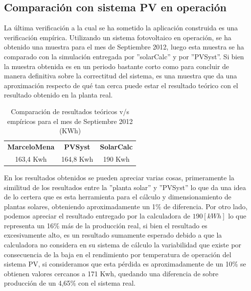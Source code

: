 \newpage
\subsection{Comparación con sistema PV en operación}
La última verificación a la cual se ha sometido la aplicación construida es una verificación empírica. Utilizando un sistema fotovoltaico en operación, se ha obtenido una muestra para el mes de Septiembre 2012, luego esta muestra se ha comparado con la simulación entregada por ''solarCalc'' y por ''PVSyst''. Si bien la muestra obtenida es en un periodo bastante corto como para concluir de manera definitiva sobre la correctitud del sistema, es una muestra que da una aproximación respecto de qué tan cerca puede estar el resultado teórico con el resultado obtenido en la planta real.\\
\begin{table}[h!]
\caption{Comparación de resultados teóricos v/s empíricos para el mes de Septiembre 2012 (KWh)}
\centering
\begin{tabular}{|c|c|c|}
        \hline
        \textbf{MarceloMena}&\textbf{PVSyst}&\textbf{SolarCalc}\\
        163,4 Kwh&    164,8 Kwh&   190 Kwh\\
        \hline
\end{tabular}
\end{table}

En los resultados obtenidos se pueden apreciar varias cosas, primeramente la similitud de los resultados entre la ''planta solar'' y ''PVSyst'' lo que da una idea de lo certera que es esta herramienta para el cálculo y dimensionamiento de plantas solares, obteniendo aproximadamente un 1\% de diferencia. Por otro lado, podemos apreciar el resultado entregado por la calculadora de $190 [kWh]$ lo que representa un 16\% más de la producción real, si bien el resultado es excesivamente alto, es un resultado sumamente esperado debido a que la calculadora no considera en su sistema de cálculo la variabilidad que existe por consecuencia de la baja en el rendimiento por temperatura de operación del sistema PV, si consideramos que esta pérdida es aproximadamente de un 10\% se obtienen valores cercanos a 171 Kwh, quedando una diferencia de sobre producción de un 4,65\% con el sistema real.
